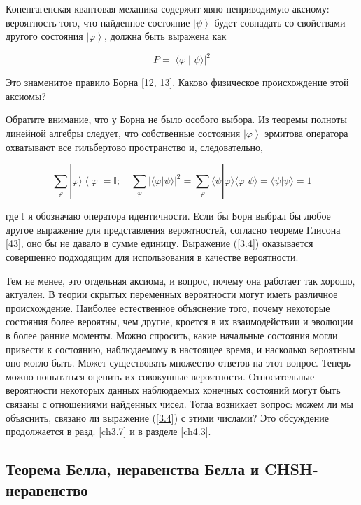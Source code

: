 \documentclass[main.tex]{subfiles}
\begin{document}
Копенгагенская квантовая механика содержит явно неприводимую аксиому: вероятность того, что найденное состояние $\left|\psi\right>$ будет совпадать со свойствами другого состояния $\left|\varphi\right>$, должна быть выражена как

\begin{equation}\label{3.4}
	P = | \langle \varphi \mid \psi \rangle |^2
\end{equation}
           
Это знаменитое правило Борна [12, 13]. Каково физическое происхождение этой аксиомы?

Обратите внимание, что у Борна не было особого выбора. Из теоремы полноты линейной алгебры следует, что собственные состояния $\left|\varphi\right>$ эрмитова оператора охватывают все гильбертово пространство и, следовательно,

\begin{equation}\label{3.5}
	\sum_{\varphi}|\varphi\rangle\left\langle\varphi\right|=\mathbb{I} ; \quad \sum_{\varphi}\left|\langle\varphi | \psi\rangle\right|^{2}=\sum_{\varphi}\langle\psi |\varphi\rangle\langle\varphi | \psi\rangle=\langle\psi | \psi\rangle= 1
\end{equation}

где $\mathbb{I}$ я обозначаю оператора идентичности. Если бы Борн выбрал бы любое другое выражение для представления вероятностей, согласно теореме Глисона [43], оно бы не давало в сумме единицу. Выражение (\ref{3.4}) оказывается совершенно подходящим для использования в качестве вероятности.

Тем не менее, это отдельная аксиома, и вопрос, почему она работает так хорошо, актуален. В теории скрытых переменных вероятности могут иметь различное происхождение. Наиболее естественное объяснение того, почему некоторые состояния более вероятны, чем другие, кроется в их взаимодействии и эволюции в более ранние моменты. Можно спросить, какие начальные состояния могли привести к состоянию, наблюдаемому в настоящее время, и насколько вероятным оно могло быть. Может существовать множество ответов на этот вопрос. Теперь можно попытаться оценить их совокупные вероятности. Относительные вероятности некоторых данных наблюдаемых конечных состояний могут быть связаны с отношениями найденных чисел. Тогда возникает вопрос: можем ли мы объяснить, связано ли выражение (\ref{3.4}) с этими числами? Это обсуждение продолжается в разд. \ref{ch3.7} и в разделе \ref{ch4.3}.

\subsection{Теорема Белла, неравенства Белла и CHSH-неравенство}\label{ch3.6}
\end{document}
